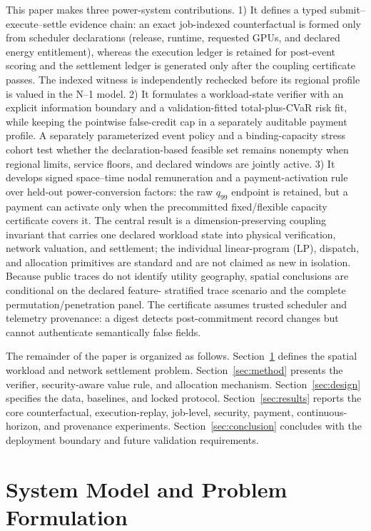\documentclass[10pt,journal]{IEEEtran}
\begin{document}
This paper makes three power-system contributions. 1) It defines a typed
submit--execute--settle evidence chain: an exact job-indexed counterfactual is
formed only from scheduler declarations (release, runtime, requested GPUs,
and declared energy entitlement), whereas the execution ledger is retained
for post-event scoring and the settlement ledger is generated only after the
coupling certificate passes. The indexed witness is independently rechecked
before its regional profile is valued in the N--1 model. 2) It formulates a
workload-state verifier with an explicit information boundary and a
validation-fitted total-plus-CVaR risk fit, while keeping the pointwise
false-credit cap in a separately auditable payment profile. A separately
parameterized event policy and a binding-capacity stress cohort test whether
the declaration-based feasible set remains nonempty when regional limits,
service floors, and declared windows are jointly active. 3) It develops signed
space--time nodal remuneration and a payment-activation rule over held-out
power-conversion factors: the raw $q_{99}$ endpoint is retained, but a payment
can activate only when the precommitted fixed/flexible capacity certificate
covers it. The central result is a
dimension-preserving coupling invariant that carries one declared workload
state into physical verification, network valuation, and settlement; the
individual linear-program (LP), dispatch, and allocation primitives are standard and are not
claimed as new in isolation. Because public traces do not identify utility
geography, spatial conclusions are conditional on the declared feature-
stratified trace scenario and the complete permutation/penetration panel.
The certificate assumes trusted scheduler and telemetry provenance: a digest
detects post-commitment record changes but cannot authenticate semantically
false fields.

The remainder of the paper is organized as follows. Section~\ref{sec:model}
defines the spatial workload and network settlement problem. Section~\ref{sec:method}
presents the verifier, security-aware value rule, and allocation mechanism.
Section~\ref{sec:design} specifies the data, baselines, and locked protocol.
Section~\ref{sec:results} reports the core counterfactual, execution-replay,
job-level, security, payment, continuous-horizon, and provenance experiments.
Section~\ref{sec:conclusion} concludes with the deployment boundary and future
validation requirements.

\section{System Model and Problem Formulation}\label{sec:model}
\end{document}
